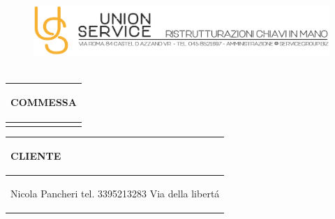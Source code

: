 \documentclass[a4paper]{article}
\begin{document}
    
                          \begin{figure}[!t]
                          \includegraphics[width=15.8cm, height=3cm]{intestazioneAlta2.jpg}
                          \end{figure}
    
                          \noindent\begin{tabular}{| L{72.2mm} |}
                              \hline
                              \vspace{2.5mm}
                              \begin{spacing}{0}
                              \textbf{COMMESSA}
                              \end{spacing}\\
                              \hline
                              \vspace{4mm}
                              \begin{spacing}{1.2}
    
                           \newline  \newline 
                            \end{spacing}\\
                              \hline
                            \end{tabular}
                            \quad
                            \begin{tabular}{ | R{72.2mm} | }
                              \hline
                              \vspace{2.5mm}
                              \begin{spacing}{0}
                              \textbf{CLIENTE}
                              \end{spacing}\\
                              \hline
                              \vspace{4mm}
                              \begin{spacing}{1.2}
    
                         Nicola Pancheri \newline tel. 3395213283 \newline Via della libert\'a
                            \end{spacing}\\
                              \hline
                            \end{tabular}
    
\end{document}
